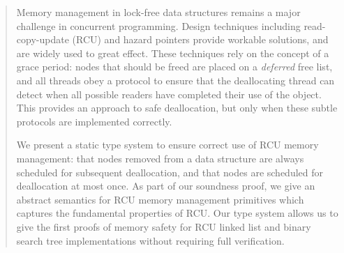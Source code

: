 \documentclass[runningheads]{llncs}
\renewcommand{\and}{\\}
\begin{document}
%
\begin{abstract}
Memory management in lock-free data structures remains a major challenge in concurrent programming.  Design techniques including read-copy-update (RCU) and hazard pointers provide workable solutions, and are widely used to great effect.  These techniques rely on the concept of a grace period: nodes that should be freed are placed on a \emph{deferred} free list, and all threads obey a protocol to ensure that the deallocating thread can detect when all possible readers have completed their use of the object. This provides an approach to safe deallocation, but only when these subtle protocols are implemented correctly.

We present a static type system to ensure correct use of RCU memory management: that nodes removed from a data structure are always scheduled for subsequent deallocation, and that nodes are scheduled for deallocation at most once. As part of our soundness proof, we give an abstract semantics for RCU memory management primitives which captures the fundamental properties of RCU. 
Our type system allows us to give the first proofs of memory safety for RCU linked list and binary search tree implementations without requiring full verification.


\end{abstract}\raggedbottom
\end{document}
